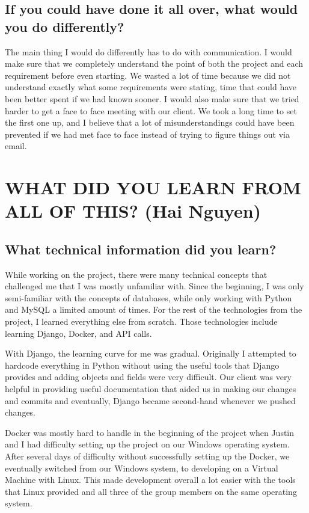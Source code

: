 \documentclass[draftclsnofoot,10pt,onecolumn]{IEEEtran} %
\begin{document}
\subsection{If you could have done it all over, what would you do differently?}
The main thing I would do differently has to do with communication. I would make
sure that we completely understand the point of both the project and each
requirement before even starting. We wasted a lot of time because we did not
understand exactly what some requirements were stating, time that could have
been better spent if we had known sooner. I would also make sure that we tried
harder to get a face to face meeting with our client. We took a long time to set
the first one up, and I believe that a lot of misunderstandings could have been
prevented if we had met face to face instead of trying to figure things out via
email.

\section{WHAT DID YOU LEARN FROM ALL OF THIS? (Hai Nguyen)}

\subsection{What technical information did you learn?}
While working on the project, there were many technical concepts that challenged
me that I was mostly unfamiliar with. Since the beginning, I was only
semi-familiar with the concepts of databases, while only working with Python and
MySQL a limited amount of times. For the rest of the technologies from the
project, I learned everything else from scratch. Those technologies include
learning Django, Docker, and API calls. 

With Django, the learning curve for me was gradual. Originally I attempted to
hardcode everything in Python without using the useful tools that Django
provides and adding objects and fields were very difficult. Our client was very
helpful in providing useful documentation that aided us in making our changes
and commits and eventually, Django became second-hand whenever we pushed
changes. 

Docker was mostly hard to handle in the beginning of the project when Justin and
I had difficulty setting up the project on our Windows operating system. After
several days of difficulty without successfully setting up the Docker, we
eventually switched from our Windows system, to developing on a Virtual Machine
with Linux. This made development overall a lot easier with the tools that Linux
provided and all three of the group members on the same operating system.
\end{document}
